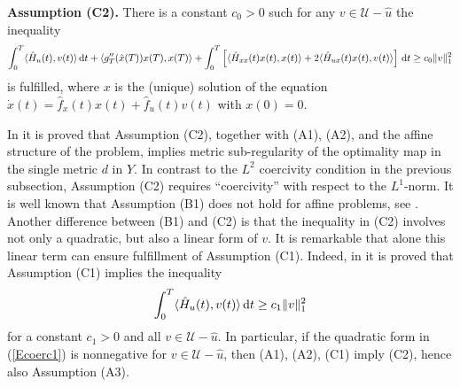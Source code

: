 \documentclass[11pt]{article}
\newcommand{\bd}{\begin{displaymath}}
\newcommand{\ed}{\end{displaymath}}
\newcommand{\be}{\begin{equation}}
\newcommand{\ee}{\end{equation}}
\newcommand{\U}{\mathcal U}
\newcommand{\dd}{\mbox{\rm\,d}}
\renewcommand{\lll}{\langle}
\newcommand{\rrr}{\rangle}
\newcommand{\bino}{\bigskip\noindent}
\begin{document}
\bino
{\bf Assumption (C2).} There is a constant $c_0 > 0$ such for any $v \in \U - \hat u$ the inequality 
\be \label{Ecoerc1}
      \int_0^T\lll \hat H_{u}(t), v(t) \rrr \dd t +  \langle g_{T}''(\hat x(T))x(T),x(T)\rangle +   \int_0^T \left[ \lll \hat H_{xx}(t) x(t), x(t)  \rrr  + 2 \lll \hat H_{ux}(t) x(t), v(t)  \rrr  \right] \dd t  
      \geq  c_0 \| v \|_1^2
\ee
is fulfilled, where $x$ is the (unique) solution of the equation $\dot x(t) = \hat f_x(t) x(t) + \hat f_u(t) v(t)$ with $x(0) = 0$.

\bino
In \cite[Theorem 3.1]{Os+Ve-20} it is proved that
Assumption (C2), together with (A1), (A2), and the affine structure of 
the problem, implies metric sub-regularity of the optimality map in the single metric $d$ in $Y$.
In contrast to the $L^2$ coercivity condition in the previous subsection, Assumption (C2) requires 
``coercivity'' with respect to the $L^1$-norm. 
It is well known that Assumption (B1) does not hold for affine problems, see \cite[Lemma 3]{Don+Kra+Vel-18}. 
Another difference between (B1) and (C2) is that the inequality in (C2) involves not only a quadratic, but also a
linear form of $v$. It is remarkable that alone this linear term can ensure fulfillment of Assumption (C1). 
Indeed, in \cite[Proposition 4.1]{Os+Ve-20} it is proved that Assumption (C1) implies the inequality
\bd
      \int_0^T\lll \hat H_{u}(t), v(t) \rrr \dd t \geq  c_1 \| v \|_1^2
\ed 
for a constant $c_1 > 0$ and all $v \in \U - \hat u$. In particular, if the quadratic form in (\ref{Ecoerc1}) is nonnegative 
for $v \in \U - \hat u$, then (A1), (A2), (C1) imply (C2), hence also Assumption (A3). 

\end{document}
